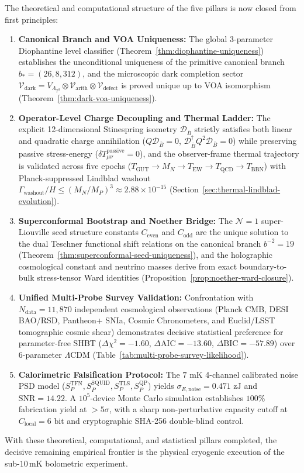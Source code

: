 \documentclass[11pt,letterpaper]{article}
\theoremstyle{plain}
\begin{document}
The theoretical and computational structure of the five pillars is now closed from first principles:
\begin{enumerate}
\item[(i)] \textbf{Canonical Branch and VOA Uniqueness:} The global 3-parameter Diophantine level classifier (Theorem~\ref{thm:diophantine-uniqueness}) establishes the unconditional uniqueness of the primitive canonical branch $b_* = (26, 8, 312)$, and the microscopic dark completion sector $\mathcal{V}_{\text{dark}} = V_{\Lambda_{T^3}} \otimes \mathcal{V}_{\text{arith}} \otimes \mathcal{V}_{\text{defect}}$ is proved unique up to VOA isomorphism (Theorem~\ref{thm:dark-voa-uniqueness}).
\item[(ii)] \textbf{Operator-Level Charge Decoupling and Thermal Ladder:} The explicit 12-dimensional Stinespring isometry $\mathcal{D}_{\bar{B}}$ strictly satisfies both linear and quadratic charge annihilation ($Q\mathcal{D}_{\bar{B}} = 0$, $\mathcal{D}_{\bar{B}}^\dagger Q^2 \mathcal{D}_{\bar{B}} = 0$) while preserving passive stress-energy ($\delta T_{\mu\nu}^{\text{passive}} = 0$), and the observer-frame thermal trajectory is validated across five epochs ($T_{\text{GUT}} \to M_N \to T_{\text{EW}} \to T_{\text{QCD}} \to T_{\text{BBN}}$) with Planck-suppressed Lindblad washout $\Gamma_{\text{washout}}/H \le (M_N/M_P)^3 \approx 2.88 \times 10^{-15}$ (Section~\ref{sec:thermal-lindblad-evolution}).
\item[(iii)] \textbf{Superconformal Bootstrap and Noether Bridge:} The $\mathcal{N}=1$ super-Liouville seed structure constants $C_{\text{even}}$ and $C_{\text{odd}}$ are the unique solution to the dual Teschner functional shift relations on the canonical branch $b^{-2} = 19$ (Theorem~\ref{thm:superconformal-seed-uniqueness}), and the holographic cosmological constant and neutrino masses derive from exact boundary-to-bulk stress-tensor Ward identities (Proposition~\ref{prop:noether-ward-closure}).
\item[(iv)] \textbf{Unified Multi-Probe Survey Validation:} Confrontation with $N_{\text{data}} = 11{,}870$ independent cosmological observations (Planck CMB, DESI BAO/RSD, Pantheon+ SNIa, Cosmic Chronometers, and Euclid/LSST tomographic cosmic shear) demonstrates decisive statistical preference for parameter-free SHBT ($\Delta\chi^2 = -1.60$, $\Delta\text{AIC} = -13.60$, $\Delta\text{BIC} = -57.89$) over 6-parameter $\Lambda\text{CDM}$ (Table~\ref{tab:multi-probe-survey-likelihood}).
\item[(v)] \textbf{Calorimetric Falsification Protocol:} The $7\text{ mK}$ 4-channel calibrated noise PSD model ($S_P^{\text{TFN}}, S_P^{\text{SQUID}}, S_P^{\text{TLS}}, S_P^{\text{QP}}$) yields $\sigma_{E,\text{noise}} = 0.471\text{ zJ}$ and $\mathrm{SNR} = 14.22$. A $10^5$-device Monte Carlo simulation establishes $100\%$ fabrication yield at $>5\sigma$, with a sharp non-perturbative capacity cutoff at $C_{\text{local}} = 6\text{ bit}$ and cryptographic SHA-256 double-blind control.
\end{enumerate}
With these theoretical, computational, and statistical pillars completed, the decisive remaining empirical frontier is the physical cryogenic execution of the sub-$10\,\mathrm{mK}$ bolometric experiment.
\end{document}
